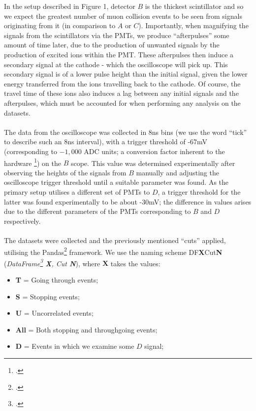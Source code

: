 \documentclass[a4paper]{article}
\begin{document}
In the setup described in Figure 1, detector $B$ is the thickest scintillator and so we expect the greatest number of muon collision events to be seen from signals originating from it (in comparison to $A$ or $C$).
Importantly, when magnifying the signals from the scintillators via the PMTs, we produce ``afterpulses'' some amount of time later, due to the production of unwanted signals by the production of excited ions within the PMT.
These afterpulses then induce a secondary signal at the cathode - which the oscilloscope will pick up.
This secondary signal is of a lower pulse height than the initial signal, given the lower energy transferred from the ions travelling back to the cathode.
Of course, the travel time of these ions also induces a lag between any initial signals and the afterpulses, which must be accounted for when performing any analysis on the datasets.
\\\\
The data from the oscilloscope was collected in 8ns bins (we use the word ``tick'' to describe such an 8ns interval), with a trigger threshold of -67mV (corresponding to $-1,000$ ADC units; a conversion factor inherent to the hardware \footcite{script}) on the $B$ scope.
This value was determined experimentally after observing the heights of the signals from $B$ manually and adjusting the oscilloscope trigger threshold until a suitable parameter was found.
As the primary setup utilises a different set of PMTs to $D$, a trigger threshold for the latter was found experimentally to be about -30mV; the difference in values arises due to the different parameters of the PMTs corresponding to $B$ and $D$ respectively.
\\\\
The datasets were collected and the previously mentioned ``cuts'' applied, utilising the Pandas\footcite{pandas} framework. We use the naming scheme DF{\bf X}Cut{\bf N} (\textit{DataFrame\footcite{dataframe} \textbf{X}, Cut \textbf{N}}), where $ \textbf{X}$ takes the values:
\begin{itemize}
	\item \textbf{T} = Going through events;
	\item \textbf{S} = Stopping events;
	\item \textbf{U} = Uncorrelated events;
	\item \textbf{All} = Both stopping and throughgoing events;
	\item \textbf{D} = Events in which we examine some $D$ signal;
\end{itemize}
\end{document}
